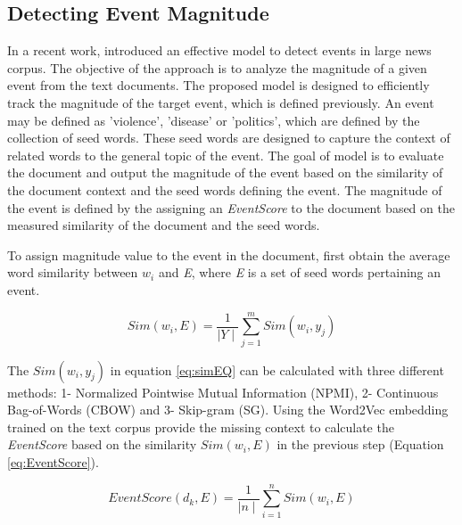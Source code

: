 \subsection{Detecting Event Magnitude}
In a recent work, \cite{Agrawal2016DetectingTM} introduced an effective model to detect events in large  news corpus. The objective of the approach is to analyze the magnitude of a given event from the text documents. The proposed model is designed to efficiently track the magnitude of the target event, which is defined previously. An event may be defined as 'violence', 'disease' or 'politics', which are defined by the collection of seed words. These seed words are designed to capture the context of related words to the general topic of the event. The goal of model is to evaluate the document and output the magnitude of the event based on the similarity of the document context and the seed words defining the event. The magnitude of the event is defined by the assigning an \textit{EventScore} to the document based on the measured similarity of the document and the seed words.  

To assign magnitude value to the event in the  document, \cite{Agrawal2016DetectingTM} first obtain the average word similarity between $w_i$ and \textit{E}, where \textit{E} is a set of seed words pertaining an event. 

\begin{equation}\label{eq:simEQ}
Sim (w_i, E) =  \frac{1}{\mid Y\mid}    \sum_{j=1}^{m} Sim(w_i, y_j)
\end{equation}

The $Sim (w_i, y_j)$ in equation \ref{eq:simEQ} can be calculated with three different methods: 1- Normalized Pointwise Mutual Information (NPMI), 2- Continuous Bag-of-Words (CBOW) and 3- Skip-gram (SG). Using the Word2Vec embedding \cite{Mikolov} trained on the text corpus provide the missing context to calculate the \textit{EventScore} based on the similarity $Sim (w_i, E)$ in the previous step (Equation \ref{eq:EventScore}). 

\begin{equation}\label{eq:EventScore}
EventScore (d_k, E) =  \frac{1}{\mid n\mid}    \sum_{i=1}^{n} Sim(w_i, E)
\end{equation}

